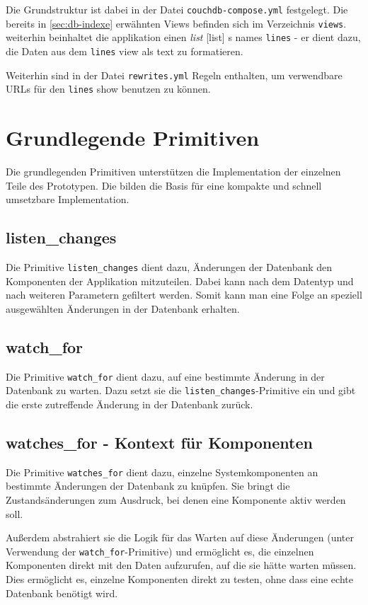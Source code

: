 Die Grundstruktur ist dabei in der Datei \verb|couchdb-compose.yml| festgelegt.
Die bereits in \cref{sec:db-indexe} erwähnten Views befinden sich im Verzeichnis \verb|views|.
weiterhin beinhaltet die applikation einen \emph{list} \cite{couchdb:guide}[list] s names \verb|lines| - er dient dazu, die Daten aus dem \verb|lines| view als text zu formatieren.

Weiterhin sind in der Datei \verb|rewrites.yml| Regeln enthalten, um verwendbare URLs für den \verb|lines| show benutzen zu können.

\section{Grundlegende Primitiven}
\label{sec:imp:primitiven}

Die grundlegenden Primitiven unterstützen die Implementation der einzelnen Teile des Prototypen. Die bilden die Basis für eine kompakte und schnell umsetzbare Implementation.

\subsection{listen\_changes}

Die Primitive \verb|listen_changes| dient dazu,
Änderungen der Datenbank den Komponenten der Applikation mitzuteilen.
Dabei kann nach dem Datentyp und nach weiteren Parametern gefiltert werden.
Somit kann man eine Folge an speziell ausgewählten Änderungen in der Datenbank erhalten.

\subsection{watch\_for}

Die Primitive \verb|watch_for| dient dazu, auf eine bestimmte Änderung in der Datenbank zu warten. Dazu setzt sie die \verb|listen_changes|-Primitive ein und gibt die erste zutreffende Änderung in der Datenbank zurück.

\subsection{watches\_for - Kontext für Komponenten}

Die Primitive \verb|watches_for| dient dazu, einzelne Systemkomponenten
an bestimmte Änderungen der Datenbank zu knüpfen.
Sie bringt die Zustandsänderungen zum Ausdruck,
bei denen eine Komponente aktiv werden soll.

Außerdem abstrahiert sie die Logik für das Warten auf diese Änderungen
(unter Verwendung der \verb|watch_for|-Primitive)
und ermöglicht es, die einzelnen Komponenten direkt mit den Daten aufzurufen,
auf die sie hätte warten müssen.
Dies ermöglicht es, einzelne Komponenten direkt zu testen, ohne dass eine echte Datenbank benötigt wird.

